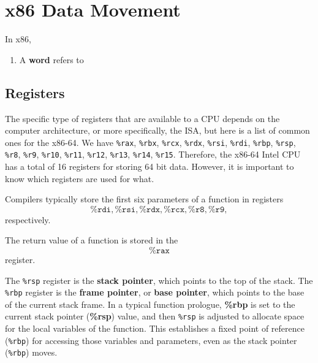 \section{x86 Data Movement} 

  \begin{definition}
    \label{def:data-types}
    In x86, 
    \begin{enumerate}
      \item A \textbf{word} refers to 
    \end{enumerate}
  \end{definition}

\subsection{Registers}

  The specific type of registers that are available to a CPU depends on the computer architecture, or more specifically, the ISA, but here is a list of common ones for the x86-64. We have \texttt{\%rax}, \texttt{\%rbx}, \texttt{\%rcx}, \texttt{\%rdx}, \texttt{\%rsi}, \texttt{\%rdi}, \texttt{\%rbp}, \texttt{\%rsp}, \texttt{\%r8}, \texttt{\%r9}, \texttt{\%r10}, \texttt{\%r11}, \texttt{\%r12}, \texttt{\%r13}, \texttt{\%r14}, \texttt{\%r15}. Therefore, the x86-64 Intel CPU has a total of 16 registers for storing 64 bit data. However, it is important to know which registers are used for what. 

  \begin{definition}
    \label{def:parameter-registers}
    Compilers typically store the first six parameters of a function in registers 
    \begin{equation}
      \texttt{\%rdi}, \texttt{\%rsi}, \texttt{\%rdx}, \texttt{\%rcx}, \texttt{\%r8}, \texttt{\%r9}, 
    \end{equation}
    respectively. 
  \end{definition}

  \begin{definition}
    \label{def:return-register}
    The return value of a function is stored in the 
    \begin{equation}
      \texttt{\%rax} 
    \end{equation}
    register.
  \end{definition}

  \begin{definition}
    \label{def:stack-and-frame-pointers}
    The \texttt{\%rsp} register is the \textbf{stack pointer}, which points to the top of the stack. The \texttt{\%rbp} register is the \textbf{frame pointer}, or \textbf{base pointer}, which points to the base of the current stack frame. In a typical function prologue, \textbf{\%rbp} is set to the current stack pointer (\textbf{\%rsp}) value, and then \texttt{\%rsp} is adjusted to allocate space for the local variables of the function. This establishes a fixed point of reference (\texttt{\%rbp}) for accessing those variables and parameters, even as the stack pointer (\texttt{\%rbp}) moves.
  \end{definition}


